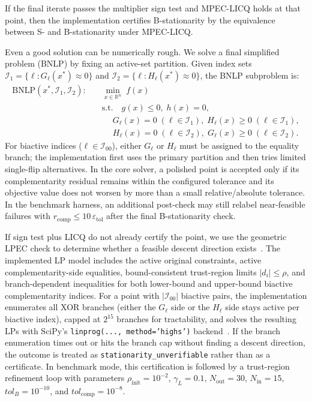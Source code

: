 If the final iterate passes the multiplier sign test and MPEC-LICQ holds at that point, then the implementation certifies B-stationarity by the equivalence between S- and B-stationarity under MPEC-LICQ.

Even a good solution can be numerically rough. We solve a final simplified problem (BNLP) by fixing an active-set partition. Given index sets $\mathcal{I}_1 = \{\ell : G_\ell(x^*) \approx 0\}$ and $\mathcal{I}_2 = \{\ell : H_\ell(x^*) \approx 0\}$, the BNLP subproblem is:
\begin{equation}
\begin{aligned}
  \text{BNLP}(x^*,\mathcal{I}_1,\mathcal{I}_2): \quad & \min_{x \in \mathbb{R}^n} \; f(x) \\
  & \text{s.t.} \quad g(x) \leq 0, \; h(x) = 0, \\
  & \quad\; G_\ell(x) = 0 \; (\ell \in \mathcal{I}_1), \; H_\ell(x) \geq 0 \; (\ell \in \mathcal{I}_1), \\
  & \quad\; H_\ell(x) = 0 \; (\ell \in \mathcal{I}_2), \; G_\ell(x) \geq 0 \; (\ell \in \mathcal{I}_2).
\end{aligned}
\label{eq:bnlp}
\end{equation}
For biactive indices ($\ell \in \mathcal{I}_{00}$), either $G_\ell$ or
$H_\ell$ must be assigned to the equality branch; the implementation
first uses the primary partition and then tries limited single-flip
alternatives. In the core solver, a polished point is accepted only if
its complementarity residual remains within the configured tolerance and
its objective value does not worsen by more than a small
relative/absolute tolerance. In the benchmark harness, an additional
post-check may still relabel near-feasible failures with
$r_{\mathrm{comp}} \le 10\,\varepsilon_{\mathrm{tol}}$ after the final
B-stationarity check.

If sign test plus LICQ
do not already certify the point, we use the geometric LPEC check to
determine whether a feasible descent direction exists~\cite{LuoPangRalph1996,FletcherLeyfferRalphScholtes2006}.
The implemented LP model includes the active original constraints,
active complementarity-side equalities, bound-consistent trust-region
limits $|d_i| \le \rho$, and branch-dependent inequalities for both
lower-bound and upper-bound biactive complementarity indices. For a
point with $|\mathcal{I}_{00}|$ biactive pairs, the implementation
enumerates all XOR branches (either the $G_\ell$ side or the $H_\ell$
side stays active per biactive index), capped at $2^{15}$ branches for
tractability, and solves the resulting LPs with SciPy's
\texttt{linprog(..., method='highs')} backend~\cite{HuangfuHall2018}.
If the branch enumeration times out or hits the branch cap without
finding a descent direction, the outcome is treated as
\texttt{stationarity\_unverifiable} rather than as a certificate. In
benchmark mode, this certification is followed by a trust-region
refinement loop with parameters
$\rho_{\mathrm{init}} = 10^{-2}$, $\gamma_L = 0.1$,
$N_{\mathrm{out}} = 30$, $N_{\mathrm{in}} = 15$,
$tol_B = 10^{-10}$, and $tol_{\mathrm{comp}} = 10^{-8}$.

